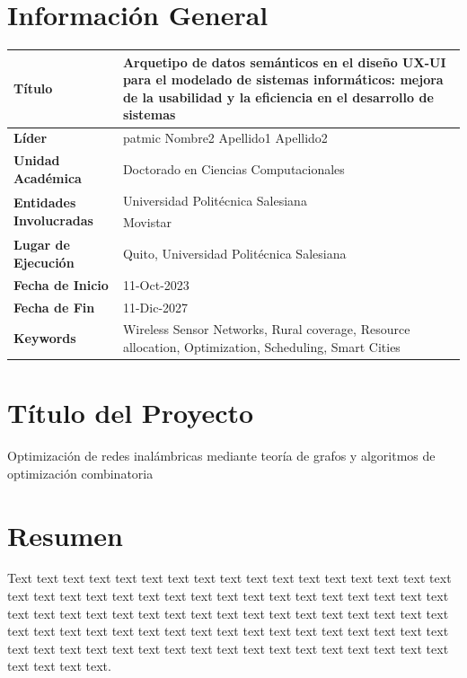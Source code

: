 \documentclass[12pt,a4paper]{article}
\begin{document}

\section{Información General}\label{sec:GeneralInformation}
\begin{table}[ht!]
\centering
\begin{tabular}{p{4cm}|p{9cm}}
\hline
\textbf{Título}  & 
Arquetipo de datos semánticos en el diseño UX-UI para el modelado de sistemas informáticos: mejora de la usabilidad y la eficiencia en el desarrollo de sistemas   \\
\hline
\textbf{Líder} & patmic Nombre2 Apellido1 Apellido2 \\
\hline
\textbf{Unidad Académica} & Doctorado en Ciencias Computacionales \\
\hline
\multirow{2}{4cm}{\textbf{Entidades Involucradas}} & Universidad Politécnica Salesiana \\
& Movistar \\ \hline
\textbf{Lugar de Ejecución} & Quito, Universidad Politécnica Salesiana \\
\hline
\textbf{Fecha de Inicio} &   11-Oct-2023\\
\hline
\textbf{Fecha de Fin} &  11-Dic-2027 \\
\hline
\textbf{Keywords} & Wireless Sensor Networks, Rural coverage, Resource allocation, Optimization, Scheduling, Smart Cities \\
\hline
\end{tabular}
\end{table}
\section{Título del Proyecto}
Optimización de redes inalámbricas mediante teoría de grafos y algoritmos de optimización combinatoria
\section{Resumen}\label{sec:1}
Text text text text text text text text text text text text text text text text text text text text text text text text text text text text text text text text text text text text text text text text text text text text text text text text text text text text text text text text text text text text text text text text text text text text text text text text text text text text text text text text text text text text text text text text text.
\end{document}
